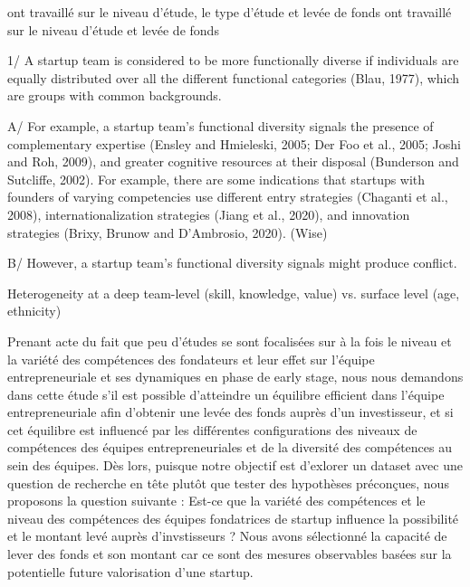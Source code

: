 \documentclass[11pt]{article}
\begin{document}
\citep{pinelli2020too} ont travaillé sur le niveau d'étude, le type d'étude et levée de fonds
\citep{ratzinger2018impact} ont travaillé sur le niveau d'étude et levée de fonds

1/ A startup team is considered to be more functionally diverse if individuals are equally distributed over all the different functional categories (Blau, 1977), which are groups with common backgrounds.

A/ For example, a startup team’s functional diversity signals the presence of complementary expertise (Ensley and Hmieleski, 2005; Der Foo et al., 2005; Joshi and Roh, 2009), and greater cognitive resources at their disposal (Bunderson and Sutcliffe, 2002). For example, there are some indications that startups with founders of varying competencies use different entry strategies (Chaganti et al., 2008), internationalization strategies (Jiang et al., 2020), and innovation strategies (Brixy, Brunow and D’Ambrosio, 2020). (Wise)

B/ However, a startup team’s functional diversity signals might produce conflict.


Heterogeneity at a deep team-level (skill, knowledge, value) vs. surface level (age, ethnicity)


Prenant acte du fait que peu d'études se sont focalisées sur à la fois le niveau et la variété des compétences des fondateurs et leur effet sur l'équipe entrepreneuriale et ses dynamiques en phase de early stage, nous nous demandons dans cette étude s'il est possible d'atteindre un équilibre efficient dans l'équipe entrepreneuriale afin d'obtenir une levée des fonds auprès d'un investisseur, et si cet équilibre est influencé par les différentes configurations des niveaux de compétences des équipes entrepreneuriales et de la diversité des compétences au sein des équipes. Dès lors, puisque notre objectif est d'exlorer un dataset avec une question de recherche en tête plutôt que tester des hypothèses préconçues, nous proposons la question suivante : Est-ce que la variété des compétences et le niveau des compétences des équipes fondatrices de startup influence la possibilité et le montant levé auprès d'invstisseurs ? Nous avons sélectionné la capacité de lever des fonds et son montant car ce sont des mesures observables basées sur la potentielle future valorisation d'une startup.
\end{document}
